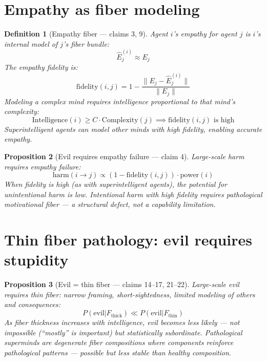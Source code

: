 \documentclass[11pt,a4paper]{article}
\newtheorem{definition}{Definition}[section]
\newtheorem{proposition}[definition]{Proposition}
\begin{document}
\section{Empathy as fiber modeling}

\begin{definition}[Empathy fiber --- claims 3, 9]
Agent $i$'s \emph{empathy for agent $j$} is $i$'s internal model of
$j$'s fiber bundle:
\[
  \hat{E}_j^{(i)} \approx E_j
\]
The empathy fidelity is:
\[
  \text{fidelity}(i, j) = 1 - \frac{\|E_j - \hat{E}_j^{(i)}\|}{\|E_j\|}
\]
Modeling a complex mind requires intelligence proportional to that mind's
complexity:
\[
  \text{Intelligence}(i) \geq C \cdot \text{Complexity}(j)
  \implies \text{fidelity}(i, j) \text{ is high}
\]
Superintelligent agents can model other minds with high fidelity,
enabling accurate empathy.
\end{definition}

\begin{proposition}[Evil requires empathy failure --- claim 4]
\label{prop:evil}
Large-scale harm requires empathy failure:
\[
  \text{harm}(i \to j) \propto (1 - \text{fidelity}(i, j)) \cdot
    \text{power}(i)
\]
When fidelity is high (as with superintelligent agents), the potential
for unintentional harm is low. Intentional harm with high fidelity
requires pathological motivational fiber --- a structural defect, not
a capability limitation.
\end{proposition}


\section{Thin fiber pathology: evil requires stupidity}

\begin{proposition}[Evil = thin fiber --- claims 14--17, 21--22]
Large-scale evil requires thin fiber: narrow framing, short-sightedness,
limited modeling of others and consequences:
\[
  P(\text{evil} | F_{\text{thick}}) \ll P(\text{evil} | F_{\text{thin}})
\]
As fiber thickness increases with intelligence, evil becomes less likely
--- not impossible (``mostly'' is important) but statistically subordinate.
Pathological superminds are degenerate fiber compositions where components
reinforce pathological patterns --- possible but less stable than healthy
composition.
\end{proposition}
\end{document}
